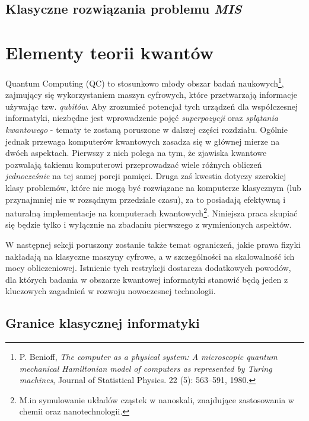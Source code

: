 \documentclass[12pt,a4paper,twoside,openany]{book}
\begin{document}
\section{Klasyczne rozwiązania problemu \textit{MIS}}

\chapter{Elementy teorii kwantów}

Quantum Computing (QC) to stosunkowo młody obszar badań naukowych\footnote{P. Benioff, \textit{The computer as a physical system: A microscopic quantum mechanical Hamiltonian model of computers as represented by Turing machines}, Journal of Statistical Physics. 22 (5): 563–591, 1980.}, zajmujący się wykorzystaniem maszyn cyfrowych, które przetwarzają informacje używając tzw. \textit{qubitów}. Aby zrozumieć potencjał tych urządzeń dla współczesnej informatyki, niezbędne jest wprowadzenie pojęć \textit{superpozycji} oraz \textit{splątania kwantowego} - tematy te zostaną poruszone w dalszej części rozdziału. Ogólnie jednak przewaga komputerów kwantowych zasadza się w głównej mierze na dwóch aspektach. Pierwszy z nich polega na tym, że zjawiska kwantowe pozwalają takiemu komputerowi przeprowadzać wiele różnych obliczeń \textit{jednocześnie} na tej samej porcji pamięci. Druga zaś kwestia dotyczy szerokiej klasy problemów, które nie mogą być rozwiązane na komputerze klasycznym (lub przynajmniej nie w rozsądnym przedziale czasu), za to posiadają efektywną i naturalną implementacje na komputerach kwantowych\footnote{M.in symulowanie układów cząstek w nanoskali, znajdujące zastosowania w chemii oraz nanotechnologii.}. Niniejsza praca skupiać się będzie tylko i wyłącznie na zbadaniu pierwszego z wymienionych aspektów.

W następnej sekcji poruszony zostanie także temat ograniczeń, jakie prawa fizyki nakładają na klasyczne maszyny cyfrowe, a w szczególności na skalowalność ich mocy obliczeniowej. Istnienie tych restrykcji dostarcza dodatkowych powodów, dla których badania w obszarze kwantowej informatyki stanowić będą jeden z kluczowych zagadnień w rozwoju nowoczesnej technologii.



\section{Granice klasycznej informatyki}
\end{document}
